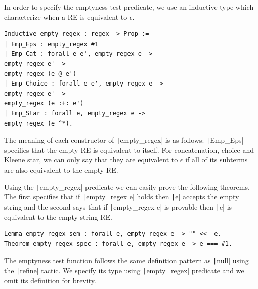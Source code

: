 \documentclass[oneside,12pt]{scrbook}
\theoremstyle{definition}
\newcommand{\coq}[1]{\texttt|#1|}
\theoremstyle{plain}
\theoremstyle{definition}
\begin{document}
In order to specify the emptyness test predicate, we use an inductive type
which characterize when a RE is equivalent to $\epsilon$.
\begin{verbatim}
Inductive empty_regex : regex -> Prop :=
| Emp_Eps : empty_regex #1
| Emp_Cat : forall e e', empty_regex e ->
empty_regex e' ->
empty_regex (e @ e')
| Emp_Choice : forall e e', empty_regex e ->
empty_regex e' ->
empty_regex (e :+: e')
| Emp_Star : forall e, empty_regex e ->
empty_regex (e ^*).
\end{verbatim}
The meaning of each constructor of \coq{empty_regex} is as follows:
\coq{Emp_Eps} specifies that the empty RE is equivalent to itself.
For concatenation, choice and Kleene star, we can only say that they are
equivalent to $\epsilon$ if all of its subterms are also equivalent
to the empty RE.

Using the \coq{empty_regex} predicate we can easily prove the following
theorems. The first specifies that if \coq{empty_regex e} holds then
\coq{e} accepts the empty string and the second says that if
\coq{empty_regex e} is provable then \coq{e} is equivalent to the empty
string RE.

\begin{verbatim}
Lemma empty_regex_sem : forall e, empty_regex e -> "" <<- e.
Theorem empty_regex_spec : forall e, empty_regex e -> e === #1.
\end{verbatim}

The emptyness test function follows the same definition pattern as \coq{null}
using the \coq{refine} tactic. We specify its type using \coq{empty_regex}
predicate and we omit its definition for brevity.
\end{document}
